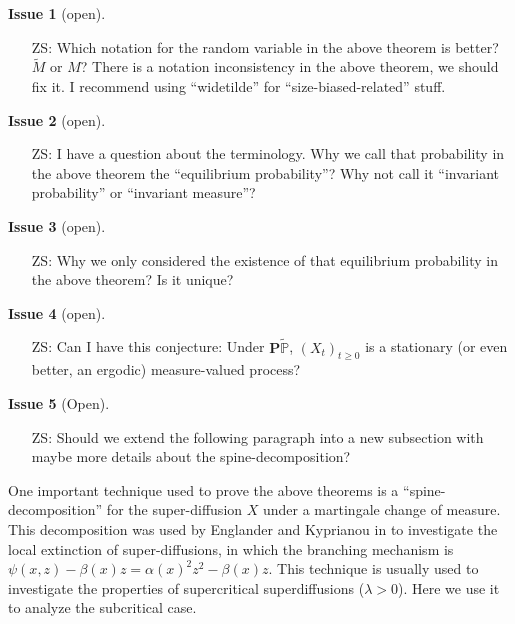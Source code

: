 \documentclass[12pt,a4paper]{amsart}
\numberwithin{equation}{section}
\theoremstyle{plain}
\theoremstyle{definition}
\newtheorem{iss}{Issue}
\begin{document}
\begin{iss}[open]~
  \begin{itemize}
  \item[ZS:]
    Which notation for the random variable in the above theorem is better? $\widetilde M$ or $M$? There is a notation inconsistency in the above theorem, we should fix it. I recommend using ``widetilde'' for ``size-biased-related'' stuff.
  \end{itemize}
\end{iss}
\begin{iss}[open]~
  \begin{itemize}
  \item[ZS:]
I have a question about the terminology. Why we call that probability in the above theorem the ``equilibrium probability''? Why not call it ``invariant probability'' or ``invariant measure''?
  \end{itemize}
\end{iss}
\begin{iss}[open]~
  \begin{itemize}
  \item[ZS:]
Why we only considered the existence of that equilibrium probability in the above theorem? Is it unique?
  \end{itemize}
\end{iss}
\begin{iss}[open]~
  \begin{itemize}
  \item[ZS:]
Can I have this conjecture: Under $\mathbf P \widetilde{\mathbb P}$, $(X_t)_{t\geq 0}$ is a stationary (or even better, an ergodic) measure-valued process? 
  \end{itemize}
\end{iss}

\begin{iss}[Open]~
  \begin{itemize}
  \item[ZS:]
Should we extend the following paragraph into a new subsection with maybe more details about the spine-decomposition?
  \end{itemize}
\end{iss}
One important technique used to prove the above theorems is a ``spine-decomposition'' for the super-diffusion $X$ under a martingale change of measure.
This decomposition was used by Englander and Kyprianou in \cite{EnglanderKyprianou2004Local} to investigate the local extinction of super-diffusions, in which the branching mechanism is $\psi(x,z)-\beta(x)z=\alpha(x)^2z^2-\beta(x)z$.
This technique is usually used to investigate the properties of supercritical superdiffusions ($\lambda>0$).
Here we use it to analyze the subcritical case.
\end{document}
